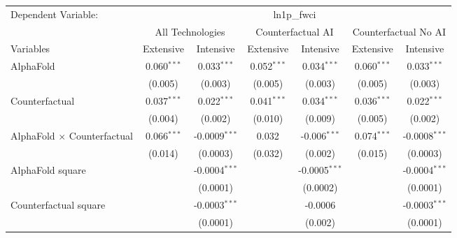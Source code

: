 \begingroup
\centering
\begin{tabular}{lcccccc}
   \tabularnewline \midrule \midrule
   Dependent Variable: & \multicolumn{6}{c}{ln1p\_fwci}\\
 & \multicolumn{2}{c}{All Technologies} & \multicolumn{2}{c}{Counterfactual AI} & \multicolumn{2}{c}{Counterfactual No AI} \\
\cmidrule(lr){1-1}\cmidrule(lr){2-3} \cmidrule(lr){4-5} \cmidrule(lr){6-7}
Variables & \multicolumn{1}{c}{Extensive} & \multicolumn{1}{c}{Intensive} & \multicolumn{1}{c}{Extensive} & \multicolumn{1}{c}{Intensive} & \multicolumn{1}{c}{Extensive} & \multicolumn{1}{c}{Intensive} \\
\cmidrule(lr){1-1}\cmidrule(lr){2-2} \cmidrule(lr){3-3} \cmidrule(lr){4-4} \cmidrule(lr){5-5} \cmidrule(lr){6-6} \cmidrule(lr){7-7}
   AlphaFold                          & 0.060$^{***}$ & 0.033$^{***}$     & 0.052$^{***}$ & 0.034$^{***}$    & 0.060$^{***}$ & 0.033$^{***}$\\   
                                      & (0.005)       & (0.003)           & (0.005)       & (0.003)          & (0.005)       & (0.003)\\   
   Counterfactual                     & 0.037$^{***}$ & 0.022$^{***}$     & 0.041$^{***}$ & 0.034$^{***}$    & 0.036$^{***}$ & 0.022$^{***}$\\   
                                      & (0.004)       & (0.002)           & (0.010)       & (0.009)          & (0.005)       & (0.002)\\   
   AlphaFold $\times$ Counterfactual  & 0.066$^{***}$ & -0.0009$^{***}$   & 0.032         & -0.006$^{***}$   & 0.074$^{***}$ & -0.0008$^{***}$\\   
                                      & (0.014)       & (0.0003)          & (0.032)       & (0.002)          & (0.015)       & (0.0003)\\   
   AlphaFold square                   &               & -0.0004$^{***}$   &               & -0.0005$^{***}$  &               & -0.0004$^{***}$\\   
                                      &               & (0.0001)          &               & (0.0002)         &               & (0.0001)\\   
   Counterfactual square              &               & -0.0003$^{***}$   &               & -0.0006          &               & -0.0003$^{***}$\\   
                                      &               & (0.0001)          &               & (0.002)          &               & (0.0001)\\   

\end{tabular}
